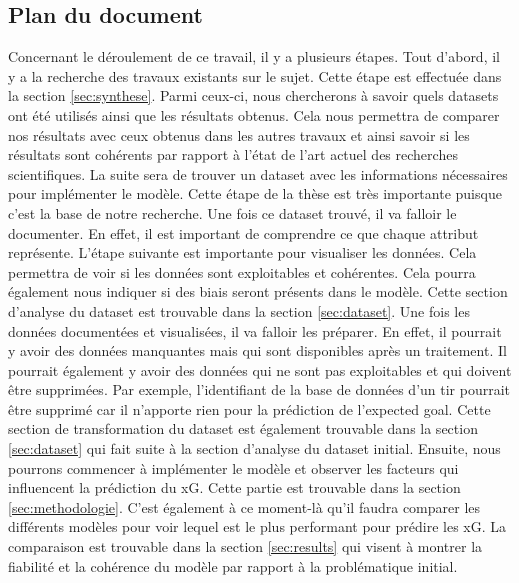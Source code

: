 \documentclass[12pt]{article}
\begin{document}
\subsection{Plan du document}
Concernant le déroulement de ce travail, il y a plusieurs étapes.
Tout d'abord, il y a la recherche des travaux existants sur le sujet.
Cette étape est effectuée dans la section \ref{sec:synthese}.
Parmi ceux-ci, nous chercherons à savoir quels datasets ont été utilisés ainsi que les résultats obtenus.
Cela nous permettra de comparer nos résultats avec ceux obtenus dans les autres travaux et ainsi savoir si les résultats sont cohérents par rapport à l'état de l'art actuel des recherches scientifiques.
\newline \newline
La suite sera de trouver un dataset avec les informations nécessaires pour implémenter le modèle.
Cette étape de la thèse est très importante puisque c'est la base de notre recherche.
Une fois ce dataset trouvé, il va falloir le documenter. En effet, il est important de comprendre ce que chaque attribut représente.
L'étape suivante est importante pour visualiser les données.
Cela permettra de voir si les données sont exploitables et cohérentes.
Cela pourra également nous indiquer si des biais seront présents dans le modèle.
Cette section d'analyse du dataset est trouvable dans la section \ref{sec:dataset}.
\newline \newline
Une fois les données documentées et visualisées, il va falloir les préparer.
En effet, il pourrait y avoir des données manquantes mais qui sont disponibles après un traitement.
Il pourrait également y avoir des données qui ne sont pas exploitables et qui doivent être supprimées.
Par exemple, l'identifiant de la base de données d'un tir pourrait être supprimé car il n'apporte rien pour la prédiction de l'expected goal.
Cette section de transformation du dataset est également trouvable dans la section \ref{sec:dataset} qui fait suite à la section d'analyse du dataset initial.
\newline \newline
Ensuite, nous pourrons commencer à implémenter le modèle et observer les facteurs qui influencent la prédiction du xG.
Cette partie est trouvable dans la section \ref{sec:methodologie}.
C'est également à ce moment-là qu'il faudra comparer les différents modèles pour voir lequel est le plus performant pour prédire les xG.
La comparaison est trouvable dans la section \ref{sec:results} qui visent à montrer la fiabilité et la cohérence du modèle par rapport à la problématique initial.
\end{document}
